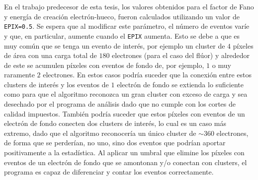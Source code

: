 En el trabajo predecesor de esta tesis\cite{TesisKevin}, los valores obtenidos para el factor de Fano y energía de creación electrón-hueco, fueron calculados utilizando un valor de \verb|EPIX=0.5|. Se espera que al modificar este parámetro, el número de eventos varíe y que, en particular, aumente cuando el \verb|EPIX| aumenta. Esto se debe a que es muy común que se tenga un evento de interés, por ejemplo un cluster de $4$ píxeles de área con una carga total de $180$ electrones (para el caso del flúor) y alrededor de este se acumulen píxeles con eventos de fondo de, por ejemplo, $1$ o muy raramente $2$ electrones. En estos casos podría suceder que la conexión entre estos clusters de interés y los eventos de $1$ electrón de fondo se extienda lo suficiente como para que el algoritmo reconozca un gran cluster con exceso de carga y sea desechado por el programa de análisis dado que no cumple con los cortes de calidad impuestos. También podría suceder que estos píxeles con eventos de un electrón de fondo conecten dos clusters de interés, lo cual es un caso más extremo, dado que el algoritmo reconocería un único cluster de $\sim 360$ electrones, de forma que se perderían, no uno, sino dos eventos que podrían aportar positivamente a la estadística. Al aplicar un umbral que elimine los píxeles con eventos de un electrón de fondo que se amontonan y/o conectan con clusters, el programa es capaz de diferenciar y contar los eventos correctamente.

